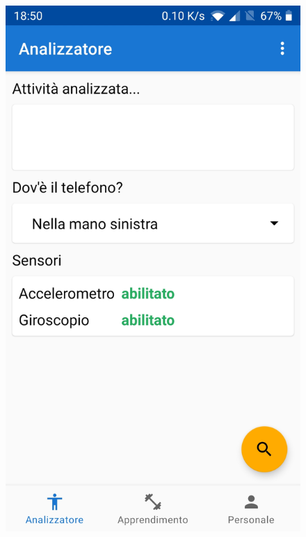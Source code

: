 \begin{figure}[H]
    \centering
    \includegraphics[scale = 0.10]{assets/images/screenshots/1a_Init.jpg}

\end{figure}
